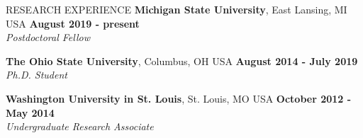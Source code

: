 \documentclass{resume} %
\begin{document}
\begin{rSection}{RESEARCH EXPERIENCE}
{\bf Michigan State University}, East Lansing, MI USA \hfill {\bf August 2019 - present} \\
{\em Postdoctoral Fellow}%

{\bf The Ohio State University}, Columbus, OH USA \hfill {\bf August 2014 - July 2019} \\
{\em Ph.D. Student}%

{\bf Washington University in St. Louis}, St. Louis, MO USA \hfill {\bf October 2012 - May 2014}\\
{\em Undergraduate Research Associate}%
\end{rSection}
\end{document}
